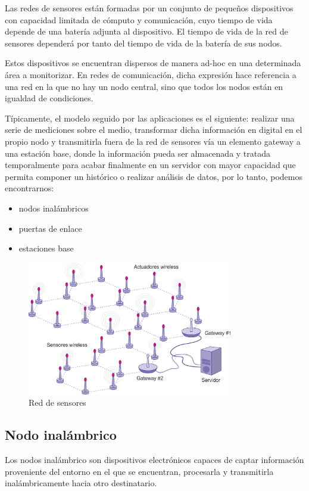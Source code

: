 Las redes de sensores est\'an formadas por un conjunto de peque\~nos dispositivos con capacidad limitada de c\'omputo y  comunicaci\'on, cuyo tiempo de vida depende de una bater\'ia adjunta al dispositivo. El tiempo de vida de la red de sensores depender\'a por tanto del tiempo de vida de la bater\'ia de sus nodos.

Estos dispositivos se encuentran dispersos de manera ad-hoc en una determinada \'area a monitorizar. En redes de comunicaci\'on, dicha expresi\'on hace referencia a una red en la que no hay un nodo central, sino que todos los nodos est\'an en igualdad de condiciones.

T\'ipicamente, el modelo seguido por las aplicaciones es el siguiente: realizar una serie de mediciones sobre el medio, transformar dicha informaci\'on en digital en el propio nodo y transmitirla fuera de la red de sensores v\'ia un elemento gateway a una estaci\'on base, donde la informaci\'on pueda ser almacenada y tratada temporalmente para acabar finalmente en un servidor con mayor capacidad que permita componer un hist\'orico o realizar an\'alisis de datos, por lo tanto, podemos encontrarnos: 

\begin{itemize}
\item nodos inal\'ambricos 
\item puertas de enlace 
\item estaciones base
\end{itemize}

\begin{figure}[htbp]
	\centering
		\includegraphics[width=0.8\textwidth]{imagenes/red_de_sensores.png}
	\caption{Red de sensores}
	\label{fig:red_de_sensores}
\end{figure}

 

\subsection{Nodo inal\'ambrico}
Los nodos inal\'ambrico son dispositivos electr\'onicos capaces de captar informaci\'on proveniente del entorno en el que se encuentran, procesarla y transmitirla inal\'ambricamente hacia otro destinatario. 

